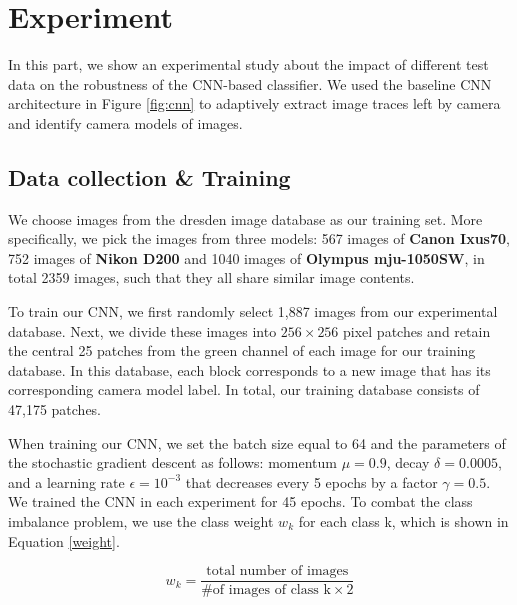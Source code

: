 \documentclass[a4paper, 9pt, twocolumn]{extarticle}
\begin{document}
\section{Experiment}
\label{section:Experiment}

In this part, we show an experimental study about the impact of different test data on the robustness of the CNN-based classifier. We used the baseline CNN architecture in Figure \ref{fig:cnn} to adaptively extract image traces left by camera and identify camera models of images.

\subsection*{Data collection \& Training}
\label{section:Data collection & Training}

We choose images from the dresden image database \cite{10.1145/1774088.1774427} as our training set. More specifically, we pick the images from three models: 567 images of \textbf{Canon Ixus70}, 752 images of \textbf{Nikon D200} and 1040 images of \textbf{Olympus mju-1050SW}, in total 2359 images, such that they all share similar image contents.

To train our CNN, we first randomly select 1,887 images from our experimental database. Next, we divide these images into $ 256 \times 256 $ pixel patches and retain the central 25 patches from the green channel of each image for our training database. In this database, each block corresponds to a new image that has its corresponding camera model label. In total, our training database consists of 47,175 patches.

When training our CNN, we set the batch size equal to 64 and the parameters of the stochastic gradient descent as follows: momentum $ \mu = 0.9 $, decay $ \delta = 0.0005 $, and a learning rate $ \epsilon = 10^{-3} $ that decreases every 5 epochs by a factor $ \gamma = 0.5 $. We trained the CNN in each experiment for 45 epochs. To combat the class imbalance problem, we use the class weight $ w_k $ for each class k, which is shown in Equation \ref{weight}.

\begin{equation} \label{weight}
	w_k = \frac{\text{total number of images}}{\text{\# of images of class k} \times 2}
\end{equation}
\end{document}
